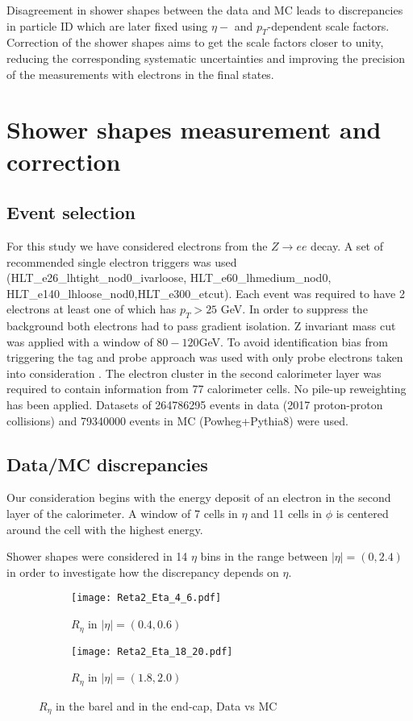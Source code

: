   Disagreement in shower shapes between the data and MC leads to discrepancies in particle ID which are later fixed using $\eta-$ and $p_T$-dependent scale factors. Correction of the shower shapes aims to get the scale factors closer to unity, reducing the corresponding systematic uncertainties and improving the precision of the measurements with electrons in the final states.  

  
  \section{ Shower shapes measurement and correction  }
  \subsection{Event selection}
  For this study we have considered electrons from the $Z\rightarrow ee$ decay. A set of recommended single electron triggers was used (HLT\_e26\_lhtight\_nod0\_ivarloose, HLT\_e60\_lhmedium\_nod0,\\
   HLT\_e140\_lhloose\_nod0,HLT\_e300\_etcut). Each event was required to have 2 electrons at least one of which has $p_T>25$ GeV.  In order to suppress the background both electrons had to pass gradient isolation. Z invariant mass cut was applied with a window of $80-120$GeV. To avoid identification bias from triggering the tag and probe approach was used with only probe electrons taken into consideration \cite{RecoID2011}. The electron cluster in the second calorimeter layer was required to contain information from 77 calorimeter cells. No pile-up reweighting has been applied. Datasets of 264786295 events in data (2017 proton-proton collisions) and 79340000 events in MC (Powheg+Pythia8) were used. 
  \subsection{Data/MC discrepancies}
  Our consideration begins with the energy deposit of an electron in the second layer of the calorimeter. A window of 7 cells in $\eta$ and 11 cells in $\phi$ is centered around the cell with the highest energy.

  Shower shapes were considered in 14 $\eta$ bins in the range between $|\eta| = (0,2.4)$ in order to investigate how the discrepancy depends on $\eta$. 
    	\begin{figure}[htbp]
  	\begin{subfigure}[t]{0.5\textwidth}
  		\texttt{[image: Reta2\_Eta\_4\_6.pdf]}
  		\caption{$R_{\eta}$ in $|\eta| = (0.4,0.6)$ }
  		\label{fig::reta_norew_04}
  	\end{subfigure}
  	\hfill
  	\begin{subfigure}[t]{0.5\textwidth} 
  		\texttt{[image: Reta2\_Eta\_18\_20.pdf]}
  		\caption{$R_{\eta}$ in $|\eta| = (1.8,2.0)$ }
  		\label{fig::reta_norew_18}
  	\end{subfigure}
  	\caption{$R_{\eta}$ in the barel and in the end-cap, Data vs MC}
  	\label{fig::reta_norew}
  \end{figure}

